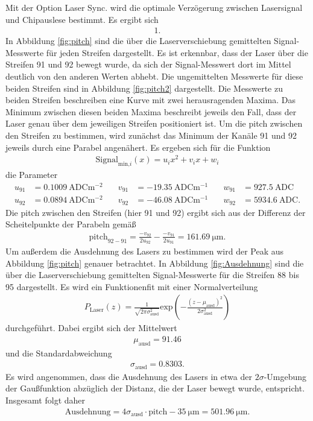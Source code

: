 Mit der Option Laser Sync. wird die optimale Verzögerung zwischen Lasersignal und
Chipauslese bestimmt. Es ergibt sich
\begin{align}
  1.
\end{align}
In Abbildung \ref{fig:pitch} sind die über die Laserverschiebung gemittelten Signal-Messwerte für jeden Streifen
dargestellt. Es ist erkennbar, dass der Laser über die Streifen 91 und 92 bewegt wurde,
da sich der Signal-Messwert dort im Mittel deutlich von den anderen Werten abhebt.
Die ungemittelten Messwerte für diese beiden Streifen sind in Abbildung \ref{fig:pitch2} dargestellt.
Die Messwerte zu beiden Streifen beschreiben eine Kurve mit zwei herausragenden Maxima.
Das Minimum zwischen diesen beiden Maxima beschreibt jeweils den Fall, dass der Laser genau über dem jeweiligen
Streifen positioniert ist. Um die pitch zwischen den Streifen zu bestimmen, wird zunächst das Minimum der Kanäle 91 und 92
jeweils durch eine Parabel angenähert. Es ergeben sich für die Funktion
\begin{align}
  \text{Signal}_{\text{min,}i}(x) = u_i x^2 + v_i x + w_i
\end{align}
die Parameter
\begin{align*}
  u_{91} &= \SI{0.1009}{\text{ADC}\meter\tothe{-2}} &\quad v_{91} &= \SI{-19.35}{\text{ADC}\meter\tothe{-1}} &\quad w_{91} &= \SI{927.5}{\text{ADC}} \\
  u_{92} &= \SI{0.0894}{\text{ADC}\meter\tothe{-2}} &\quad v_{92} &= \SI{-46.08}{\text{ADC}\meter\tothe{-1}} &\quad w_{92} &= \SI{5934.6}{\text{ADC}}.
\end{align*}
Die pitch zwischen den Streifen (hier 91 und 92) ergibt sich aus der Differenz der Scheitelpunkte der Parabeln gemäß
\begin{align}
  \text{pitch}_{92-91} = \frac{-v_{92}}{2u_{92}} - \frac{-v_{91}}{2u_{91}} = \SI{161.69}{\micro\meter}.
\end{align}
Um außerdem die Ausdehnung des Lasers zu bestimmen wird der Peak aus Abbildung \ref{fig:pitch} genauer betrachtet.
In Abbildung \ref{fig:Ausdehnung} sind die über die Laserverschiebung gemittelten Signal-Messwerte für die Streifen
88 bis 95 dargestellt. Es wird ein Funktionenfit mit einer Normalverteilung
\begin{align}
  P_\text{Laser}(z) = \frac{1}{\sqrt{2 \pi \sigma_\text{ausd}^2}} \text{exp}\left(-\frac{(z-\mu_\text{ausd})^2}{2\sigma_\text{ausd}^2}\right)
\end{align}
durchgeführt. Dabei ergibt sich der Mittelwert
\begin{align}
  \mu_\text{ausd} = 91.46
\end{align}
und die Standardabweichung
\begin{align}
  \sigma_\text{ausd} = 0.8303.
\end{align}
Es wird angenommen, dass die Ausdehnung des Lasers in etwa der $2\sigma$-Umgebung der Gaußfunktion abzüglich der Distanz, die der Laser bewegt wurde, entspricht.
Insgesamt folgt daher
\begin{align}
  \text{Ausdehnung} = 4\sigma_\text{ausd} \cdot \text{pitch} - \SI{35}{\micro\meter} = \SI{501.96}{\micro\meter}.
\end{align}

